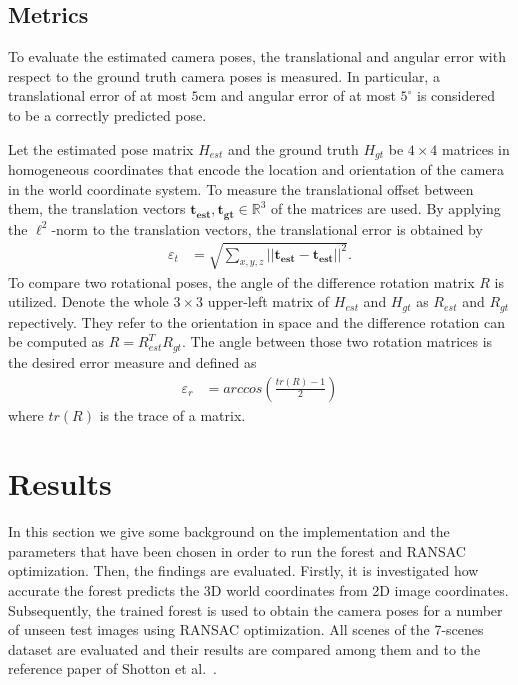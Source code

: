 \documentclass[final]{cvpr}
\begin{document}
\subsection{Metrics} \label{subsec:metrics}
To evaluate the estimated camera poses, the translational and angular error with respect to the 
ground truth camera poses is measured. In particular, a translational error of at 
most $5$cm and angular error of at most $5^{\circ}$ is considered to be a correctly predicted pose. 

Let the estimated pose matrix $H_{est}$ and the ground truth $H_{gt}$ be $4 \times 4$ matrices
in homogeneous coordinates that encode the location and orientation of the camera in the world 
coordinate system. To measure the translational offset between them, the translation vectors 
$\boldsymbol{t_{est}}, \boldsymbol{t_{gt}} \in \mathbb{R}^3$ of the matrices are used.
By applying the $\ell^2$-norm to the translation vectors, the translational error is obtained by
\begin{align}
    \varepsilon_t &= \sqrt{\sum_{x,y,z}||\boldsymbol{t_{est}} - \boldsymbol{t_{est}}||^2}.
\end{align}
To compare two rotational poses, the angle of the difference rotation matrix $R$ is utilized. 
Denote the whole $3\times3$ upper-left matrix of $H_{est}$ and $H_{gt}$ as $R_{est}$ and 
$R_{gt}$ repectively. They refer to the orientation in space and the difference rotation can be computed 
as $R = R_{est}^TR_{gt}$. The angle between those two rotation matrices is the desired
error measure and defined as
\begin{align}
    \varepsilon_r &= arccos \left( \frac{tr(R)-1}{2} \right)
\end{align}
where $tr(R)$ is the trace of a matrix.


\section{Results}
In this section we give some background on the implementation and the parameters that have been chosen in order to 
run the forest and RANSAC optimization. Then, the findings are evaluated. Firstly, it is investigated how accurate the 
forest predicts the 3D world coordinates from 2D image coordinates. Subsequently, the trained forest is used to obtain 
the camera poses for a number of unseen test images using RANSAC optimization. All scenes of the 7-scenes dataset 
are evaluated and their results are compared among them and to the reference paper of Shotton et al.~\cite{shotton2013}. 
\end{document}

